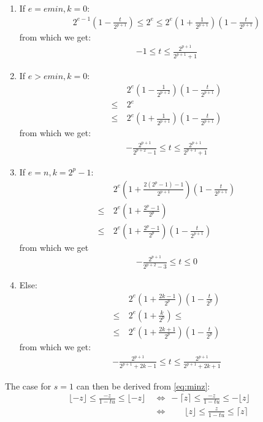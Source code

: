 \documentclass[10pt,conference]{IEEEtran}
\newcommand{\ceil}[1]{\lceil #1 \rceil}
\newcommand{\floor}[1]{\lfloor #1 \rfloor}
\begin{document}
\begin{enumerate}
\item If $e=emin, k=0$:
\begin{align*}
2^{e-1}\left(1-\frac{t}{2^{p+1}}\right)\leq 2^e\leq 2^e\left(1+\frac{1}{2^{p+1}}\right)\left(1-\frac{t}{2^{p+1}}\right)
\end{align*}
from which we get:
\begin{align}
-1\leq t\leq\frac{2^{p+1}}{2^{p+1}+1}\label{eq:trange1}
\end{align}
\item If $e>emin, k=0$:
\begin{align*}
& ~2^e\left(1-\frac{1}{2^{p+2}}\right)\left(1-\frac{t}{2^{p+1}}\right)\\
\leq & ~2^e \\
\leq & ~2^e\left(1+\frac{1}{2^{p+1}}\right)\left(1-\frac{t}{2^{p+1}}\right)
\end{align*}
from which we get:
\begin{align}
-\frac{2^{p+1}}{2^{p+2}-1}\leq t\leq \frac{2^{p+1}}{2^{p+1}+1}\label{eq:trange2}
\end{align}
\item If $e=n, k=2^p-1$:
\begin{align*}
&~ 2^e\left(1+\frac{2(2^p-1)-1}{2^{p+1}}\right)\left(1-\frac{t}{2^{p+1}}\right) \\
\leq & ~ 2^e\left(1+\frac{2^p-1}{2^p}\right) \\
\leq & ~ 2^e\left(1+\frac{2^p-1}{2^p}\right)\left(1-\frac{t}{2^{p+1}}\right)
\end{align*}
from which we get
\begin{align}
-\frac{2^{p+1}}{2^{p+2}-3}\leq t\leq 0\label{eq:trange3}
\end{align}
\item Else: 
\begin{align*}
& ~2^e\left(1+\frac{2k-1}{2^p}\right)\left(1-\frac{t}{2^p}\right) \\
\leq & ~ 2^e\left(1+\frac{k}{2^p}\right)\leq \\
\leq & ~ 2^e\left(1+\frac{2k+1}{2^p}\right)\left(1-\frac{t}{2^p}\right)
\end{align*}
from which we get:
\begin{align}
-\frac{2^{p+1}}{2^{p+1}+2k-1}\leq t\leq \frac{2^{p+1}}{2^{p+1}+2k+1}\label{eq:trange4}
\end{align}
\end{enumerate}
The case for $s=1$ can then be derived from \eqref{eq:minz}:
\begin{align*}
\floor{-z}\leq \frac{-z}{1-tu}\leq \floor{-z} &~\Leftrightarrow~ -\ceil{z}\leq \frac{-z}{1-tu}\leq -\floor{z} \\
&~\Leftrightarrow\qquad \floor{z}\leq \frac{z}{1-tu}\leq \ceil{z}
\end{align*}
\end{document}
